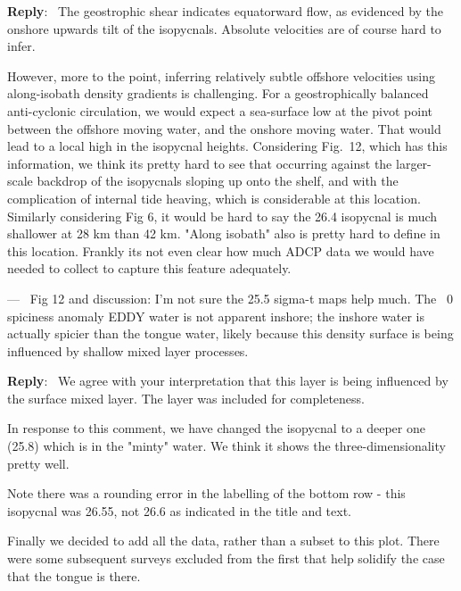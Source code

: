 \documentclass[11pt]{article}
\newcounter{reviewer}
\newcounter{point}[reviewer]
\renewcommand{\thepoint}{P\,\thereviewer.\arabic{point}}
\newenvironment{point}
   {\refstepcounter{point} \bigskip \noindent {\textbf{Reviewer~Point~\thepoint} } ---\ }
   {\par }
\newenvironment{reply}
   {\medskip \noindent \begin{sf}\textbf{Reply}:\  }
   {\medskip \end{sf}}
\begin{document}
\begin{reply}
    The geostrophic shear indicates equatorward flow, as evidenced by the onshore upwards tilt of the isopycnals.  Absolute velocities are of course hard to infer.

    However, more to the point, inferring relatively subtle offshore velocities using along-isobath density gradients is challenging.   For a geostrophically balanced anti-cyclonic circulation, we would expect a sea-surface low at the pivot point between the offshore moving water, and the onshore moving water.  That would lead to a local high in the isopycnal heights. Considering Fig.\ 12, which has this information, we think its pretty hard to see that occurring against the larger-scale backdrop of the isopycnals sloping up onto the shelf, and with the complication of internal tide heaving, which is considerable at this location.  Similarly considering Fig 6, it would be hard to say the 26.4 isopycnal is much shallower at 28 km than 42 km.  "Along isobath" also is pretty hard to define in this location.  Frankly its not even clear how much ADCP data we would have needed to collect to capture this feature adequately.
\end{reply}

\begin{point}
    Fig 12 and discussion: I'm not sure the 25.5 sigma-t maps help much. The ~0 spiciness anomaly EDDY water is not apparent inshore; the inshore water is actually spicier than the tongue water, likely because this density surface is being influenced by shallow mixed layer processes.
\end{point}

\begin{reply}
    We agree with your interpretation that this layer is being influenced by the surface mixed layer.  The layer was included for completeness.

    In response to this comment, we have changed the isopycnal to a deeper one (25.8) which is in the "minty" water.  We think it shows the three-dimensionality pretty well.

    Note there was a rounding error in the labelling of the bottom row - this isopycnal was 26.55, not 26.6 as indicated in the title and text.

    Finally we decided to add all the data, rather than a subset to this plot.  There were some subsequent surveys excluded from the first that help solidify the case that the tongue is there.
\end{reply}
\end{document}

